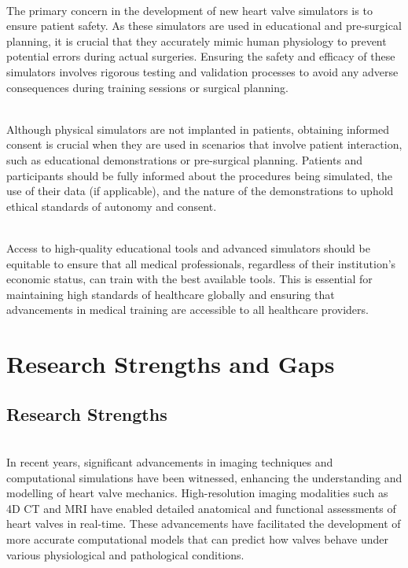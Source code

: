\\
The primary concern in the development of new heart valve simulators is to ensure patient safety. As these simulators are used in educational and pre-surgical planning, it is crucial that they accurately mimic human physiology to prevent potential errors during actual surgeries. Ensuring the safety and efficacy of these simulators involves rigorous testing and validation processes to avoid any adverse consequences during training sessions or surgical planning.~

\\
Although physical simulators are not implanted in patients, obtaining informed consent is crucial when they are used in scenarios that involve patient interaction, such as educational demonstrations or pre-surgical planning. Patients and participants should be fully informed about the procedures being simulated, the use of their data (if applicable), and the nature of the demonstrations to uphold ethical standards of autonomy and consent.~

\\
Access to high-quality educational tools and advanced simulators should be equitable to ensure that all medical professionals, regardless of their institution's economic status, can train with the best available tools. This is essential for maintaining high standards of healthcare globally and ensuring that advancements in medical training are accessible to all healthcare providers.~


\section{Research Strengths and Gaps}

\subsection{Research Strengths}

\\
In recent years, significant advancements in imaging techniques and computational simulations have been witnessed, enhancing the understanding and modelling of heart valve mechanics. High-resolution imaging modalities such as 4D \gls{CT} and \gls{MRI} have enabled detailed anatomical and functional assessments of heart valves in real-time. These advancements have facilitated the development of more accurate computational models that can predict how valves behave under various physiological and pathological conditions.

